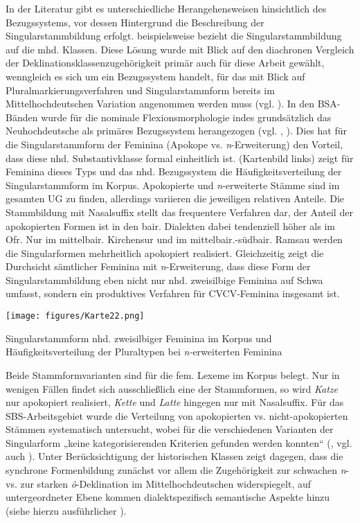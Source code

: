 In der Literatur gibt es unterschiedliche Herangehensweisen hinsichtlich des Bezugssystems, vor dessen Hintergrund die Beschreibung der Singularstammbildung erfolgt. \citet[186]{Rowley1997} beispielsweise bezieht die Singularstammbildung auf die mhd. Klassen. Diese Lösung wurde mit Blick auf den diachronen Vergleich der Deklinationsklassenzugehörigkeit primär auch für diese Arbeit gewählt, wenngleich es sich um ein Bezugssystem handelt, für das mit Blick auf Pluralmarkierungsverfahren und Singularstammform bereits im Mittelhochdeutschen Variation angenommen werden muss (vgl. \citealt[3--4]{SBS9.1}). In den BSA-Bänden wurde für die nominale Flexionsmorphologie indes grundsätzlich das Neuhochdeutsche als primäres Bezugssystem herangezogen (vgl. \citealt[XXXVI]{SBS9.1}, \citealt[8]{SMF7}). Dies hat für die Singularstammform der Feminina (Apokope vs. \textit{n}{}-Erweiterung) den Vorteil, dass diese nhd. Substantivklasse formal einheitlich ist.  (Kartenbild links) zeigt für Feminina dieses Typs und das nhd. Bezugssystem die Häufigkeitsverteilung der Singularstammform im Korpus. Apokopierte und \textit{n}{}-erweiterte Stämme sind im gesamten UG zu finden, allerdings variieren die jeweiligen relativen Anteile. Die Stammbildung mit Nasalsuffix stellt das frequentere Verfahren dar, der Anteil der apokopierten Formen ist in den bair. Dialekten dabei tendenziell höher als im Ofr. Nur im mittelbair. Kirchensur und im mittelbair.-südbair. Ramsau werden die Singularformen mehrheitlich apokopiert realisiert. Gleichzeitig zeigt die Durchsicht sämtlicher Feminina mit \textit{n}{}-Erweiterung, dass diese Form der Singularstammbildung eben nicht nur nhd. zweisilbige Feminina auf Schwa umfasst, sondern ein produktives Verfahren für CVCV-Feminina insgesamt ist.


\begin{map}
\texttt{[image: figures/Karte22.png]}
\caption{Singularstammform nhd. zweisilbiger Feminina im Korpus und Häufigkeitsverteilung der Pluraltypen bei \textit{n-}erweiterten Feminina}
\label{map:22}
\end{map}

\begin{sloppypar}
Beide Stammformvarianten sind für die fem. Lexeme im Korpus belegt. Nur in wenigen Fällen findet sich ausschließlich eine der Stammformen, so wird \textit{Katze} nur apokopiert realisiert, \textit{Kette} und \textit{Latte} hingegen nur mit Nasalsuffix. Für das SBS-Arbeitsgebiet wurde die Verteilung von apokopierten vs. nicht-apokopierten Stämmen systematisch untersucht, wobei für die verschiedenen Varianten der Singularform „keine kategorisierenden Kriterien gefunden werden konnten“ (\citealt[147 und Karten 55, 62, 67]{SBS9.1}, vgl. auch \citealt[94]{Merkle1984}). Unter Berücksichtigung der historischen Klassen zeigt \citet[191--192]{Rowley1997} dagegen, dass die synchrone Formenbildung zunächst vor allem die Zugehörigkeit zur schwachen \textit{n}{}- vs. zur starken \textit{ô}{}-Deklination im Mittelhochdeutschen widerspiegelt, auf untergeordneter Ebene kommen dialektspezifisch semantische Aspekte hinzu (siehe hierzu ausführlicher ).
\end{sloppypar}


